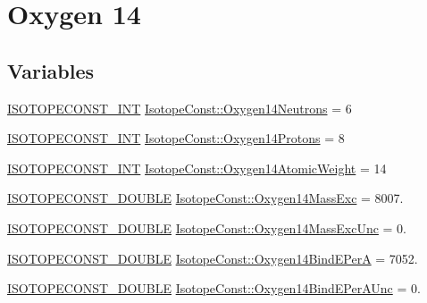 \hypertarget{group___isotope_const-_oxygen-_o14}{}\section{Oxygen 14}
\label{group___isotope_const-_oxygen-_o14}
\subsection*{Variables}
\begin{DoxyCompactItemize}
\item 
\mbox{\hyperlink{group___isotope_const-_macros_ga5f18360b3e99483a35c32d789e62621c}{I\+S\+O\+T\+O\+P\+E\+C\+O\+N\+S\+T\+\_\+\+I\+NT}} \mbox{\hyperlink{group___isotope_const-_oxygen-_o14_gadd7226e55e1fbd067cb9c9bb68bb886f}{Isotope\+Const\+::\+Oxygen14\+Neutrons}} = 6
\item 
\mbox{\hyperlink{group___isotope_const-_macros_ga5f18360b3e99483a35c32d789e62621c}{I\+S\+O\+T\+O\+P\+E\+C\+O\+N\+S\+T\+\_\+\+I\+NT}} \mbox{\hyperlink{group___isotope_const-_oxygen-_o14_gae094f457d57878ed46bb392d82bc338a}{Isotope\+Const\+::\+Oxygen14\+Protons}} = 8
\item 
\mbox{\hyperlink{group___isotope_const-_macros_ga5f18360b3e99483a35c32d789e62621c}{I\+S\+O\+T\+O\+P\+E\+C\+O\+N\+S\+T\+\_\+\+I\+NT}} \mbox{\hyperlink{group___isotope_const-_oxygen-_o14_ga39d47a30b716fbfba67a874057327036}{Isotope\+Const\+::\+Oxygen14\+Atomic\+Weight}} = 14
\item 
\mbox{\hyperlink{group___isotope_const-_macros_ga8f45a7272ce02c0b4c65c44636ed719a}{I\+S\+O\+T\+O\+P\+E\+C\+O\+N\+S\+T\+\_\+\+D\+O\+U\+B\+LE}} \mbox{\hyperlink{group___isotope_const-_oxygen-_o14_ga9dd7ee91decd43abf8625bcbca3f6da0}{Isotope\+Const\+::\+Oxygen14\+Mass\+Exc}} = 8007.
\item 
\mbox{\hyperlink{group___isotope_const-_macros_ga8f45a7272ce02c0b4c65c44636ed719a}{I\+S\+O\+T\+O\+P\+E\+C\+O\+N\+S\+T\+\_\+\+D\+O\+U\+B\+LE}} \mbox{\hyperlink{group___isotope_const-_oxygen-_o14_gad7d226f0221f90f3c701e0fa93514c8a}{Isotope\+Const\+::\+Oxygen14\+Mass\+Exc\+Unc}} = 0.
\item 
\mbox{\hyperlink{group___isotope_const-_macros_ga8f45a7272ce02c0b4c65c44636ed719a}{I\+S\+O\+T\+O\+P\+E\+C\+O\+N\+S\+T\+\_\+\+D\+O\+U\+B\+LE}} \mbox{\hyperlink{group___isotope_const-_oxygen-_o14_gae279566d51f79b6ed1a88a84e2b20ce5}{Isotope\+Const\+::\+Oxygen14\+Bind\+E\+PerA}} = 7052.
\item 
\mbox{\hyperlink{group___isotope_const-_macros_ga8f45a7272ce02c0b4c65c44636ed719a}{I\+S\+O\+T\+O\+P\+E\+C\+O\+N\+S\+T\+\_\+\+D\+O\+U\+B\+LE}} \mbox{\hyperlink{group___isotope_const-_oxygen-_o14_ga02b4fdc68a3fd96628baa653324fd18e}{Isotope\+Const\+::\+Oxygen14\+Bind\+E\+Per\+A\+Unc}} = 0.

\end{DoxyCompactItemize}
